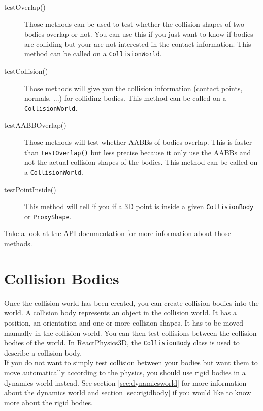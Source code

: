 \documentclass[a4paper,12pt]{article}
\begin{document}
    \begin{description}
       \item[testOverlap()] Those methods can be used to test whether the collision shapes of two bodies overlap or not. You can use this if you just want to
	       know if bodies are colliding but your are not interested in the contact information. This method can be called on a \texttt{Collision\allowbreak World}.
       \item[testCollision()] Those methods will give you the collision information (contact points, normals, ...) for colliding bodies.
	                      This method can be called on a \texttt{Collision\allowbreak World}. 
       \item[testAABBOverlap()] Those methods will test whether AABBs of bodies overlap. This is faster than \texttt{testOverlap()} but less precise because it only
	                                        use the AABBs and not the actual collision shapes of the bodies. This method can be called on a \texttt{Collision\allowbreak World}.
					\item[testPointInside()] This method will tell if you if a 3D point is inside a given \texttt{Collision\allowbreak Body} or \texttt{Proxy\allowbreak Shape}. 
    \end{description}

    Take a look at the API documentation for more information about those methods.

    \section{Collision Bodies}

    Once the collision world has been created, you can create collision bodies into the world. A collision body represents an object in the collision world.
    It has a position, an orientation and one or more collision shapes. It has to be moved manually in the collision world. You can then
    test collisions between the collision bodies of the world. In ReactPhysics3D, the \texttt{CollisionBody} class is used to describe a collision body. \\

    If you do not want to simply test collision between your bodies but want them to move automatically according to the physics, you should use rigid bodies in a
    dynamics world instead. See section \ref{sec:dynamicsworld} for more information about the dynamics world and section \ref{sec:rigidbody} if you would like to know more
    about the rigid bodies.
\end{document}
